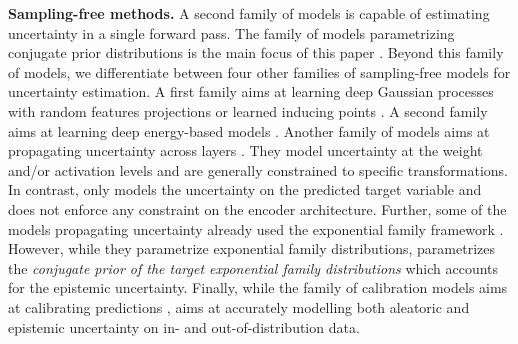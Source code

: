 \textbf{Sampling-free methods.} A second family of models is capable of estimating uncertainty in a single forward pass. The family of models parametrizing conjugate prior distributions is the main focus of this paper \citep{survey_evidential_uncertainty,evaluating_dbu,max_gap_id_ood,uncertainty-generative-classifier,multifaceted_uncertainty,graph_posterior, lightweight-prob-net}. Beyond this family of models, we differentiate between four other families of sampling-free models for uncertainty estimation. A first family aims at learning deep Gaussian processes with random features projections or learned inducing points \citep{uncertainty-distance-awareness, due, duq, uceloss}. A second family aims at learning deep energy-based models \citep{ood_ebm, jem_ebm}. Another family of models aims at propagating uncertainty across layers \citep{natural-parameter-network, sampling-free-variance-propagation, feed-forward-propagation, lightweight-prob-net, probabilistic-backprop-scalable-bnn}. They model uncertainty at the weight and/or activation levels and are generally constrained to specific transformations. In contrast, \NatPNacro{} only models the uncertainty on the predicted target variable and does not enforce any constraint on the encoder architecture. Further, some of the models propagating uncertainty already used the exponential family framework \citep{natural-parameter-network, deep-exponential-families}. However, while they parametrize exponential family distributions, \NatPNacro{} parametrizes the \emph{conjugate prior of the target exponential family distributions} which accounts for the epistemic uncertainty. Finally, while the family of calibration models aims at calibrating predictions \citep{accurate-uncertainties-deep-learning-regression, confidence-aware-learning, individual-calibration, distribution-calibration-regression, intra-order-preserving}, \NatPNacro{} aims at accurately modelling both aleatoric and epistemic uncertainty on in- and out-of-distribution data.
